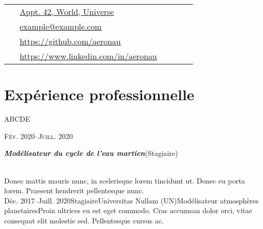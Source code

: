 \documentclass[10pt]{article} %
\newcommand{\workposition}[6]{
	\expandafter\ifstrequal\expandafter{#3}{}{}{{\raggedright #3}\hfill{\textsc{#1}}\\} %
	\expandafter\ifstrequal\expandafter{#4}{}{}{{\raggedright\large\textit{\textbf{#4}}\hfill\expandafter\ifstrequal\expandafter{#2}{}{}{{\footnotesize (#2)}}}\\[4pt]} %
	\expandafter\ifstrequal\expandafter{#5}{}{}{#5\\} %
}
\newcommand{\tableentry}[3]{
	\textsc{#1} & #2\expandafter\ifstrequal\expandafter{#3}{}{\\}{\\[3pt]} %
}
\begin{document}
\begin{paracol}{2}

 
\vspace{-0.05\textheight}
 \colorbox{shade}{
\begin{supertabular}{p{0.05\linewidth}|p{0.775\linewidth}}
\raisebox{-1pt}{\faHome}
 & \href{https://goo.gl/maps/NiMqg2mtYFxLyKfM8}{Appt. 42, World, Universe}
\\

\raisebox{0pt}{\small\faEnvelope}
 & \href{mailto:example@example.com}{example@example.com}
\\

\raisebox{-1pt}{\faGithub}
 & \href{https://github.com/aeronau}{https://github.com/aeronau}
\\

\raisebox{-1pt}{\faLinkedinSquare}
 & \href{https://www.linkedin.com/in/aeronau}{https://www.linkedin.com/in/aeronau}
\\

\end{supertabular}
}
 
\section{Expérience professionnelle}
 \workposition{Fév. 2020--Juill. 2020}{Stagiaire}{ABCDE}{Modélisateur du cycle de l'eau martien}{Donec mattis mauris nunc, in scelerisque lorem tincidunt ut. Donec eu porta lorem. Praesent hendrerit pellentesque nunc.}
 

 \workposition{Déc. 2017--Juill. 2020}{Stagiaire}{Universitas Nullam (UN)}{Modélisateur atmosphères planetaires}{Proin ultrices eu est eget commodo. Cras accumsan dolor orci, vitae consequat elit molestie sed. Pellentesque cursus ac.}
 


\end{paracol}
\end{document}
